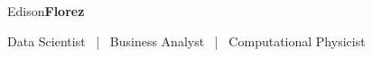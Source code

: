 \begin{center}
    {\fontsize{50}{40}\selectfont Edison\textbf{Florez}}

    \Large{
        Data Scientist ~|~ Business Analyst ~|~ Computational Physicist
    }
\end{center}
